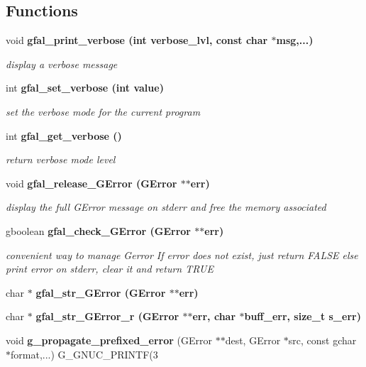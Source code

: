 \subsection*{Functions}
\begin{CompactItemize}
\item 
void \bf{gfal\_\-print\_\-verbose} (int verbose\_\-lvl, const char $\ast$msg,...)
\begin{CompactList}\small\item\em display a verbose message \item\end{CompactList}\item 
int \bf{gfal\_\-set\_\-verbose} (int value)\label{gfal__common__errverbose_8h_df0f68db7d70d7ce1f530c7a51f9cc83}

\begin{CompactList}\small\item\em set the verbose mode for the current program \item\end{CompactList}\item 
int \bf{gfal\_\-get\_\-verbose} ()\label{gfal__common__errverbose_8h_135b3fdd775aa7215e2ab4de1eea495f}

\begin{CompactList}\small\item\em return verbose mode level \item\end{CompactList}\item 
void \bf{gfal\_\-release\_\-GError} (GError $\ast$$\ast$err)\label{gfal__common__errverbose_8h_1441ea4b8176eb0cf3099009b950a3e9}

\begin{CompactList}\small\item\em display the full GError message on stderr and free the memory associated \item\end{CompactList}\item 
gboolean \bf{gfal\_\-check\_\-GError} (GError $\ast$$\ast$err)\label{gfal__common__errverbose_8h_9167aee5bda42b71a982f863e88f7bfd}

\begin{CompactList}\small\item\em convenient way to manage Gerror If error does not exist, just return FALSE else print error on stderr, clear it and return TRUE \item\end{CompactList}\item 
char $\ast$ \bf{gfal\_\-str\_\-GError} (GError $\ast$$\ast$err)
\item 
char $\ast$ \bf{gfal\_\-str\_\-GError\_\-r} (GError $\ast$$\ast$err, char $\ast$buff\_\-err, size\_\-t s\_\-err)
\item 
void \textbf{g\_\-propagate\_\-prefixed\_\-error} (GError $\ast$$\ast$dest, GError $\ast$src, const gchar $\ast$format,...) G\_\-GNUC\_\-PRINTF(3\label{gfal__common__errverbose_8h_f9695e2ac1722715b687c1818cb2993d}


\end{CompactItemize}
